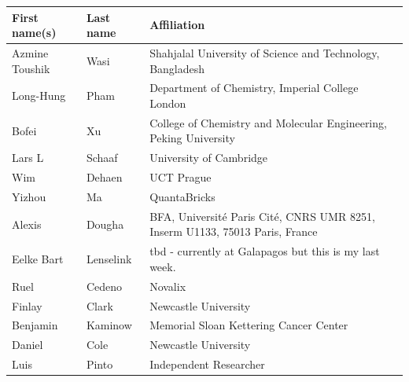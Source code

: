 \documentclass{article}
\begin{document}
\begin{table}[]
\begin{tabular}{lll}
First name(s) & Last name & Affiliation \\ \hline
\rowcolor[HTML]{FFFFFF} 
{\color[HTML]{434343} Azmine Toushik} & {\color[HTML]{434343} Wasi} & {\color[HTML]{434343} Shahjalal University of Science and Technology, Bangladesh} \\
\rowcolor[HTML]{FFFFFF} 
{\color[HTML]{434343} Long-Hung} & {\color[HTML]{434343} Pham} & {\color[HTML]{434343} Department of Chemistry, Imperial College London} \\
\rowcolor[HTML]{F8F9FA} 
{\color[HTML]{434343} Bofei} & {\color[HTML]{434343} Xu} & {\color[HTML]{434343} College of Chemistry and Molecular Engineering, Peking University} \\
\rowcolor[HTML]{FFFFFF} 
{\color[HTML]{434343} Lars L} & {\color[HTML]{434343} Schaaf} & {\color[HTML]{434343} University of Cambridge} \\
\rowcolor[HTML]{F8F9FA} 
{\color[HTML]{434343} Wim} & {\color[HTML]{434343} Dehaen} & {\color[HTML]{434343} UCT Prague} \\
\rowcolor[HTML]{FFFFFF} 
{\color[HTML]{434343} Yizhou} & {\color[HTML]{434343} Ma} & {\color[HTML]{434343} QuantaBricks} \\
\rowcolor[HTML]{F8F9FA} 
{\color[HTML]{434343} Alexis} & {\color[HTML]{434343} Dougha} & {\color[HTML]{434343} BFA, Université Paris Cité, CNRS UMR 8251, Inserm U1133, 75013 Paris, France} \\
\rowcolor[HTML]{FFFFFF} 
{\color[HTML]{434343} Eelke Bart} & {\color[HTML]{434343} Lenselink} & {\color[HTML]{434343} tbd - currently at Galapagos but this is my last week.} \\
\rowcolor[HTML]{F8F9FA} 
{\color[HTML]{434343} Ruel} & {\color[HTML]{434343} Cedeno} & {\color[HTML]{434343} Novalix} \\
\rowcolor[HTML]{FFFFFF} 
{\color[HTML]{434343} Finlay} & {\color[HTML]{434343} Clark} & {\color[HTML]{434343} Newcastle University} \\
\rowcolor[HTML]{F8F9FA} 
{\color[HTML]{434343} Benjamin} & {\color[HTML]{434343} Kaminow} & {\color[HTML]{434343} Memorial Sloan Kettering Cancer Center} \\
\rowcolor[HTML]{FFFFFF} 
{\color[HTML]{434343} Daniel} & {\color[HTML]{434343} Cole} & {\color[HTML]{434343} Newcastle University} \\
\rowcolor[HTML]{F8F9FA} 
{\color[HTML]{434343} Luis} & {\color[HTML]{434343} Pinto} & {\color[HTML]{434343} Independent Researcher} \\

\end{tabular}
\end{table}
\end{document}
